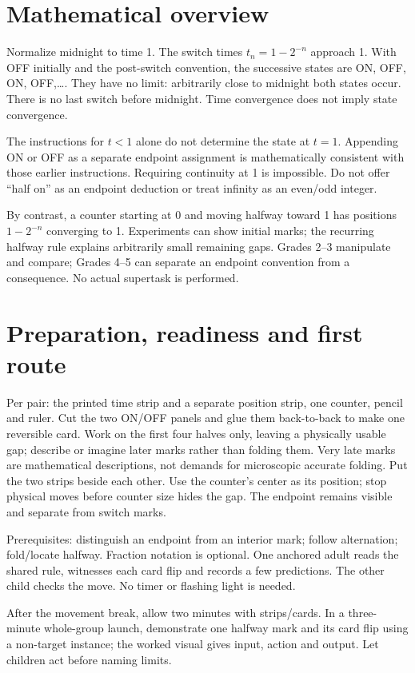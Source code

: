 \documentclass[11pt,letterpaper]{article}
\begin{document}
\section*{Mathematical overview}
Normalize midnight to time 1. The switch times $t_n=1-2^{-n}$ approach 1. With OFF initially and the post-switch convention, the successive states are ON, OFF, ON, OFF,\ldots. They have no limit: arbitrarily close to midnight both states occur. There is no last switch before midnight. Time convergence does not imply state convergence.

The instructions for $t<1$ alone do not determine the state at $t=1$. Appending ON or OFF as a separate endpoint assignment is mathematically consistent with those earlier instructions. Requiring continuity at 1 is impossible. Do not offer ``half on'' as an endpoint deduction or treat infinity as an even/odd integer.

By contrast, a counter starting at 0 and moving halfway toward 1 has positions $1-2^{-n}$ converging to 1. Experiments can show initial marks; the recurring halfway rule explains arbitrarily small remaining gaps. Grades 2--3 manipulate and compare; Grades 4--5 can separate an endpoint convention from a consequence. No actual supertask is performed.
\newpage
\section*{Preparation, readiness and first route}
Per pair: the printed time strip and a separate position strip, one counter, pencil and ruler. Cut the two ON/OFF panels and glue them back-to-back to make one reversible card. Work on the first four halves only, leaving a physically usable gap; describe or imagine later marks rather than folding them. Very late marks are mathematical descriptions, not demands for microscopic accurate folding. Put the two strips beside each other. Use the counter's center as its position; stop physical moves before counter size hides the gap. The endpoint remains visible and separate from switch marks.

Prerequisites: distinguish an endpoint from an interior mark; follow alternation; fold/locate halfway. Fraction notation is optional. One anchored adult reads the shared rule, witnesses each card flip and records a few predictions. The other child checks the move. No timer or flashing light is needed.

After the movement break, allow two minutes with strips/cards. In a three-minute whole-group launch, demonstrate one halfway mark and its card flip using a non-target instance; the worked visual gives input, action and output. Let children act before naming limits.
\end{document}
